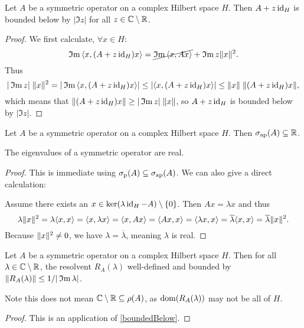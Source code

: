 \begin{proposition} \label{symmetricPlusiBoundedBelow}
Let $A$ be a symmetric operator on a complex Hilbert space $H$. Then $A + z\operatorname{id}_H$ is bounded below by $|\Im z|$ for all $z \in \mathbb{C}\setminus\mathbb{R}$.
\end{proposition}
\begin{proof}
We first calculate, $\forall x\in H$:
\[ \Im\inner{x, (A+ z\id_H)x} = \cancel{\Im\inner{x,Ax}} + \Im z\norm{x}^2. \]
Thus
\[ |\Im z|\;\norm{x}^2 = |\Im\inner{x, (A + z\id_H)x}| \leq |\inner{x, (A + z\id_H)x}| \leq \norm{x}\;\norm{(A + z\id_H)x}, \]
which means that $\lVert(A + z\operatorname{id}_H)x\rVert \geq |\operatorname{\mathfrak{I}m} z|\;\lVert x\rVert$, so $A + z\operatorname{id}_H$ is bounded below by $|\Im z|$.
\end{proof}
\begin{corollary} \label{approximateSpectrumSymmetricOperator}
Let $A$ be a symmetric operator on a complex Hilbert space $H$. Then $\sigma_\text{ap}(A) \subseteq \mathbb{R}$.
\end{corollary}
\begin{corollary}
The eigenvalues of a symmetric operator are real.
\end{corollary}
\begin{proof}
This is immediate using $\sigma_\text{p}(A)\subseteq \sigma_\text{ap}(A)$. We can also give a direct calculation:

Assume there exists an $x\in \ker(\lambda\operatorname{id}_H - A)\setminus\{0\}$. Then $Ax = \lambda x$ and thus
\[ \lambda\norm{x}^2 = \lambda\inner{x,x} = \inner{x, \lambda x} = \inner{x,Ax} = \inner{Ax,x} = \inner{\lambda x, x} = \overline{\lambda}\inner{x,x} = \overline{\lambda}\norm{x}^2. \]
Because $\lVert x\rVert^2 \neq 0$, we have $\lambda = \overline{\lambda}$, meaning $\lambda$ is real.
\end{proof}
\begin{corollary} \label{symmetricResolvent}
Let $A$ be a symmetric operator on a complex Hilbert space $H$. Then for all $\lambda\in\mathbb{C}\setminus\mathbb{R}$, the resolvent $R_A(\lambda)$ well-defined and bounded by $\lVert R_A(\lambda)\rVert\leq 1/|\operatorname{\mathfrak{I}m} \lambda|$.
\end{corollary}
Note this does not mean $\mathbb{C}\setminus\mathbb{R}\subseteq \rho(A)$, as $\operatorname{dom}(R_A(\lambda))$ may not be all of $H$.
\begin{proof}
This is an application of \ref{boundedBelow}.
\end{proof}

